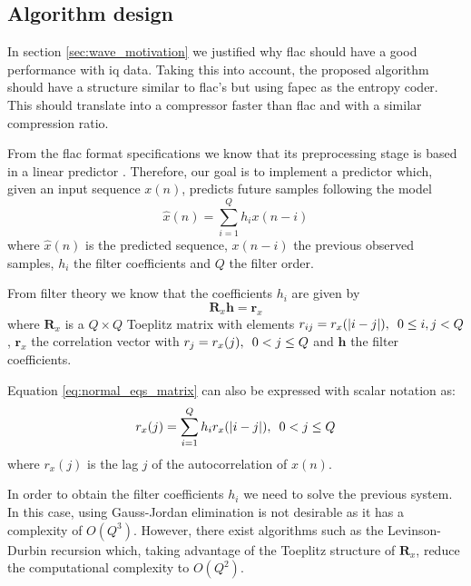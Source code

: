 \subsection{Algorithm design}
In section \ref{sec:wave_motivation} we justified why \acrshort{flac} should have a good performance with \acrshort{iq} data. Taking this into account, the proposed algorithm should have a structure similar to \acrshort{flac}'s but using \acrshort{fapec} as the entropy coder. This should translate into a compressor faster than \acrshort{flac} and with a similar compression ratio.

From the \acrshort{flac} format specifications we know that its preprocessing stage is based in a linear predictor \parencite{FLAC}. Therefore, our goal is to implement a predictor which, given an input sequence $x(n)$, predicts future samples following the model
\begin{equation} \label{eq:prediction_x}
\hat{x}(n) = \sum_{i=1}^{Q} h_i x(n-i)
\end{equation}
where $\hat{x}(n)$ is the predicted sequence, $x(n-i)$ the previous observed samples, $h_i$ the filter coefficients and $Q$ the filter order.

From filter theory \parencite{PSAVC} we know that the coefficients $h_i$ are given by
\begin{equation} \label{eq:normal_eqs_matrix}
\mathbf{R}_x \mathbf{h} = \mathbf{r}_x
\end{equation}
where $\mathbf{R}_x$ is a $Q \times Q$ Toeplitz matrix with elements $r_{ij} = r_x(|i-j|),\hspace{0.5em} 0 \leq i,j < Q$, $\mathbf{r}_x$ the correlation vector with $r_j = r_x(j),\hspace{0.5em} 0 < j \leq Q$ and $\mathbf{h}$ the filter coefficients.

Equation \ref{eq:normal_eqs_matrix} can also be expressed with scalar notation as:
\begin{equation} \label{eq:normal_equations}
r_x(j) = \sum_{i=1}^{Q} h_i r_x(|i-j|) ,\hspace{0.5em} 0 < j \leq Q
\end{equation}
where $r_x(j)$ is the lag $j$ of the autocorrelation of $x(n)$.

In order to obtain the filter coefficients $h_i$ we need to solve the previous system. In this case, using Gauss-Jordan elimination is not desirable as it has a complexity of $O(Q^3)$. However, there exist algorithms such as the Levinson-Durbin recursion \parencite{LevinsonDurbin} which, taking advantage of the Toeplitz structure of $\mathbf{R}_x$, reduce the computational complexity to $O(Q^2)$.

